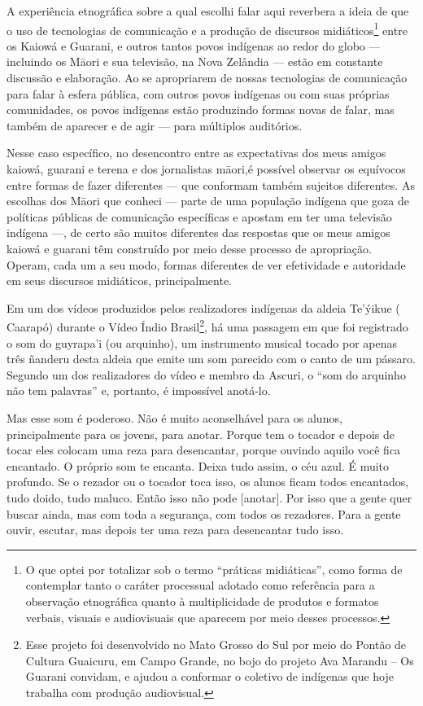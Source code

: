 A experiência etnográfica sobre a qual escolhi falar aqui reverbera a
ideia de que o uso de tecnologias de comunicação e a produção de
discursos midiáticos\footnote{O que optei por totalizar sob o termo
``práticas midiáticas'', como forma de contemplar tanto o caráter
processual adotado como referência para a observação etnográfica quanto
à multiplicidade de produtos e formatos verbais, visuais e audiovisuais
que aparecem por meio desses processos.} entre os Kaiowá e Guarani, e
outros tantos povos indígenas ao redor do globo — incluindo os M\=aori
e sua televisão, na Nova Zelândia — estão em constante discussão e
elaboração. Ao se apropriarem de nossas tecnologias de comunicação para
falar à esfera pública, com outros povos indígenas ou com suas próprias
comunidades, os povos indígenas estão produzindo formas novas de falar,
mas também de aparecer e de agir — para múltiplos auditórios.

Nesse caso específico, no desencontro entre as expectativas dos meus
amigos kaiowá, guarani e terena e dos jornalistas m\=aori,é possível observar os
equívocos entre formas de fazer diferentes — que conformam também
sujeitos diferentes. As escolhas dos M\=aori que conheci — parte de uma
população indígena que goza de políticas públicas de comunicação
específicas e apostam em ter uma televisão indígena —, de certo são
muitos diferentes das respostas que os meus amigos kaiowá e guarani têm
construído por meio desse processo de apropriação. Operam, cada um a
seu modo, formas diferentes de ver efetividade e autoridade em seus
discursos midiáticos, principalmente.

Em um dos vídeos produzidos pelos realizadores indígenas da aldeia
Te’ýikue ( Caarapó) durante o Vídeo Índio Brasil\footnote{Esse
projeto foi desenvolvido no Mato Grosso do Sul por meio do Pontão de
Cultura Guaicuru, em Campo Grande, no bojo do projeto Ava Marandu – Os
Guarani convidam, e ajudou a conformar o coletivo de indígenas que hoje
trabalha com produção audiovisual.  }, há uma passagem em que foi
registrado o som do guyrapa’i (ou arquinho), um instrumento musical
tocado por apenas três ñanderu desta aldeia que emite um som parecido
com o canto de um pássaro. Segundo um dos realizadores do vídeo e
membro da Ascuri, o ``som do arquinho não tem palavras'' e, portanto, é
impossível anotá-lo.

Mas esse som é poderoso. Não é muito aconselhável para os alunos,
principalmente para os jovens, para anotar. Porque tem o tocador e
depois de tocar eles colocam uma reza para desencantar, porque ouvindo
aquilo você fica encantado. O próprio som te encanta. Deixa tudo assim,
o céu azul. É muito profundo. Se o rezador ou o tocador toca isso, os
alunos ficam todos encantados, tudo doido, tudo maluco. Então isso não
pode [anotar]. Por isso que a gente quer buscar ainda, mas com toda a
segurança, com todos os rezadores. Para a gente ouvir, escutar, mas
depois ter uma reza para desencantar tudo isso.

